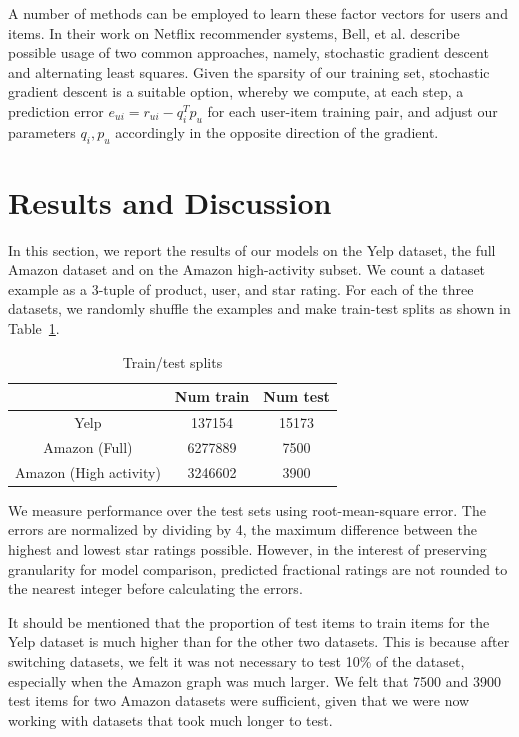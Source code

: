 \documentclass[letterpaper, 11 pt, conference]{ieeeconf}
\begin{document}
A number of methods can be employed to learn these factor vectors for
users and items. In their work on Netflix recommender systems, Bell, et al.
\cite{bib:bellkor} describe possible usage of two common approaches, namely,
stochastic gradient descent and alternating least squares. Given the
sparsity of our training set, stochastic gradient descent is a suitable
option, whereby we compute, at each step, a prediction error $e_{ui}
=r_{ui}-q_i^Tp_u$ for each user-item training pair, and adjust our
parameters $q_i,p_u$ accordingly in the opposite direction of the gradient.


\section{Results and Discussion}
\label{sec:results}

In this section, we report the results of our models on the Yelp dataset, 
the full Amazon
dataset and on the Amazon high-activity subset. We count a dataset  
example as a 3-tuple of product, user, and star rating. For each of the three 
datasets, we randomly shuffle the examples and make train-test splits as shown 
in Table~\ref{table:traintest}.

\begin{table}[htb]
\centering
\begin{tabular}{|c|c|c|}
\cline{2-3}

\multicolumn{1}{c|}{}  & {Num train}  & {Num test} \tabularnewline \hline
Yelp & 137154 & 15173 \tabularnewline
Amazon (Full) & 6277889 & 7500 \tabularnewline
Amazon (High activity) & 3246602 & 3900 \tabularnewline
\hline
\end{tabular}
\caption{Train/test splits}
\label{table:traintest}
\end{table}

We measure performance over the test sets using 
root-mean-square error. The errors are normalized by dividing by 4, the maximum 
difference between the highest and lowest star ratings possible. However, 
in the interest of preserving granularity for model comparison, predicted
fractional ratings are not rounded to the nearest integer before calculating 
the errors. 

It should be mentioned that the proportion of test items to train items for 
the Yelp dataset is much higher than for the other two datasets. This is 
because after switching datasets, we felt it was not necessary to test 10\% of 
the dataset, especially when the Amazon graph was much larger. We felt that 
7500 and 3900 test items for two Amazon datasets were sufficient, given that we 
were now working with datasets that took much longer to test. 
\end{document}
